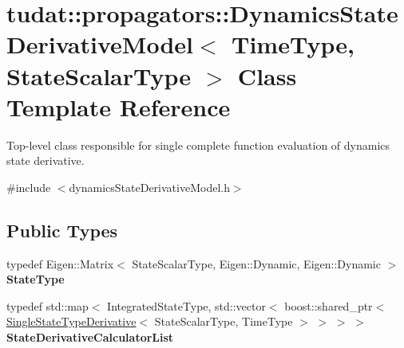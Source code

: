 \hypertarget{classtudat_1_1propagators_1_1DynamicsStateDerivativeModel}{}\section{tudat\+:\+:propagators\+:\+:Dynamics\+State\+Derivative\+Model$<$ Time\+Type, State\+Scalar\+Type $>$ Class Template Reference}
\label{classtudat_1_1propagators_1_1DynamicsStateDerivativeModel}


Top-\/level class responsible for single complete function evaluation of dynamics state derivative.  




{\ttfamily \#include $<$dynamics\+State\+Derivative\+Model.\+h$>$}

\subsection*{Public Types}
\begin{DoxyCompactItemize}
\item 
typedef Eigen\+::\+Matrix$<$ State\+Scalar\+Type, Eigen\+::\+Dynamic, Eigen\+::\+Dynamic $>$ {\bfseries State\+Type}\hypertarget{classtudat_1_1propagators_1_1DynamicsStateDerivativeModel_a221ebd630673f02899062e6010793ee9}{}\label{classtudat_1_1propagators_1_1DynamicsStateDerivativeModel_a221ebd630673f02899062e6010793ee9}

\item 
typedef std\+::map$<$ Integrated\+State\+Type, std\+::vector$<$ boost\+::shared\+\_\+ptr$<$ \hyperlink{classtudat_1_1propagators_1_1SingleStateTypeDerivative}{Single\+State\+Type\+Derivative}$<$ State\+Scalar\+Type, Time\+Type $>$ $>$ $>$ $>$ {\bfseries State\+Derivative\+Calculator\+List}\hypertarget{classtudat_1_1propagators_1_1DynamicsStateDerivativeModel_a66a1996d3a7339037f61d0d3096c1ba2}{}\label{classtudat_1_1propagators_1_1DynamicsStateDerivativeModel_a66a1996d3a7339037f61d0d3096c1ba2}

\end{DoxyCompactItemize}
